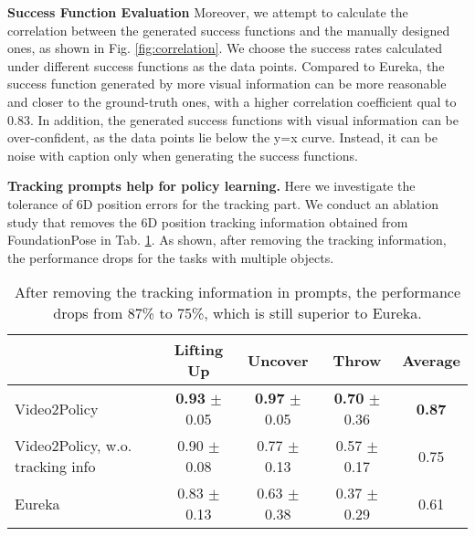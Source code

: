 
\textbf{Success Function Evaluation}
Moreover, we attempt to calculate the correlation between the generated success functions and the manually designed ones, as shown in Fig. \ref{fig:correlation}. We choose the success rates calculated under different success functions as the data points. Compared to Eureka, the success function generated by more visual information can be more reasonable and closer to the ground-truth ones, with a higher correlation coefficient qual to 0.83. In addition, the generated success functions with visual information can be over-confident, as the data points lie below the y=x curve. Instead, it can be noise with caption only when generating the success functions. 

\textbf{Tracking prompts help for policy learning.} Here we investigate the tolerance of 6D position errors for the tracking part. We conduct an ablation study that removes the 6D position tracking information obtained from FoundationPose in Tab. \ref{tab:ablation_no_tracking}. As shown, after removing the tracking information, the performance drops for the tasks with multiple objects.

\begin{table}[!h]
    \centering
    \caption{\label{tab:ablation_no_tracking} After removing the tracking information in prompts, the performance drops from 87\% to 75\%, which is still superior to Eureka.} 
    \begin{tabular}{l|ccc|c}
        \toprule
         & Lifting Up & Uncover & Throw & Average \\
        \midrule
        Video2Policy & \textbf{0.93} $\pm$ 0.05 & \textbf{0.97} $\pm$ 0.05 & \textbf{0.70} $\pm$ 0.36 & \textbf{0.87} \\
        Video2Policy, w.o. tracking info & 0.90 $\pm$ 0.08 & 0.77 $\pm$ 0.13 & 0.57 $\pm$ 0.17 & 0.75 \\
        Eureka & 0.83 $\pm$ 0.13 & 0.63 $\pm$ 0.38 & 0.37 $\pm$ 0.29 & 0.61 \\
        \bottomrule
    \end{tabular}
\end{table}

